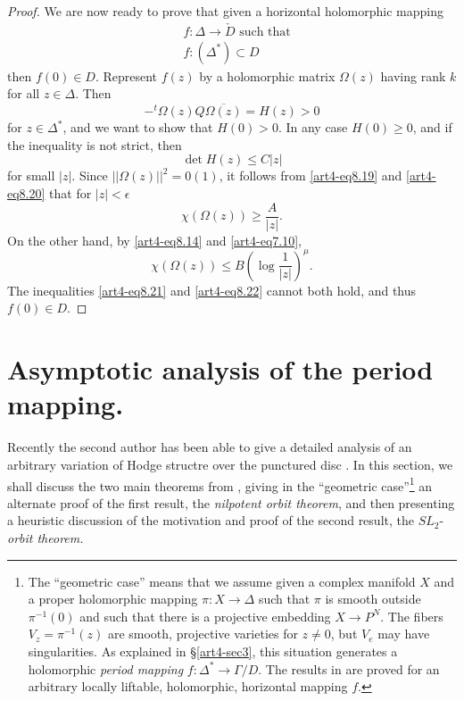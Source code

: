 \begin{proof}
We are now ready to prove that given a horizontal holomorphic mapping
\begin{align*}
& f : \Delta \rightarrow \check{D} \text{ such that}\\
& f: (\Delta^\ast) \subset D
\end{align*}
then $f (0) \in D$. Represent $f(z)$ by a holomorphic matrix $\Omega(z)$ having rank $k$ for all $z \in\Delta$. Then
$$
- {}^t\Omega(z) Q \overline{\Omega(z)} = H (z) > 0
$$
for $z \in \Delta^\ast$, and we want to show that $H(0) >0$. In any case $H (0) \geqslant 0$, and if the inequality is not strict, then 
\begin{equation}
\det H(z) \leqslant C |z|
\label{art4-eq8.20}
\end{equation}\pageoriginale
for small $|z|$. Since $||\Omega(z)||^2 = 0 (1)$, it follows from \eqref{art4-eq8.19} and \eqref{art4-eq8.20} that for $|z| <\epsilon$
\begin{equation}\label{art4-eq8.21}
\chi (\Omega (z)) \geqslant \frac{A}{|z|}.
\end{equation}
On the other hand, by \eqref{art4-eq8.14} and \eqref{art4-eq7.10},
\begin{equation}
\chi (\Omega(z)) \leqslant B \left(\log \frac{1}{|z|} \right)^\mu.
\label{art4-eq8.22}
\end{equation}
The inequalities \eqref{art4-eq8.21} and \eqref{art4-eq8.22} cannot both hold, and thus $f(0) \in D$.
\end{proof}

\section{Asymptotic analysis of the period mapping.}\label{art4-sec9}
Recently the second author has been able to give a detailed analysis of an arbitrary variation of Hodge structre over the punctured disc \cite{art4-key41}. In this section, we shall discuss the two main theorems from \cite{art4-key41}, giving in  the ``geometric case''\footnote[37]{The ``geometric case'' means that we assume given a complex manifold $X$ and a proper holomorphic mapping $\pi: X \to \Delta$ such that $\pi$ is smooth outside $\pi^{-1} (0)$ and such that there is a projective embedding $X \to P^N$. The fibers $V_z = \pi^{-1} (z)$ are smooth, projective varieties for $z \neq 0$, but $V_e$ may have singularities. As explained in \S \eqref{art4-sec3}, this situation generates a holomorphic \textit{period mapping} $f : \Delta^\ast \to \Gamma/ D$. The results in \cite{art4-key41} are proved for an arbitrary locally liftable, holomorphic, horizontal mapping $f$.} an alternate proof of the first result, the \textit{nilpotent orbit theorem}, and then presenting a heuristic discussion of the motivation and proof of the second result, the $SL_2$-\textit{orbit theorem.}

